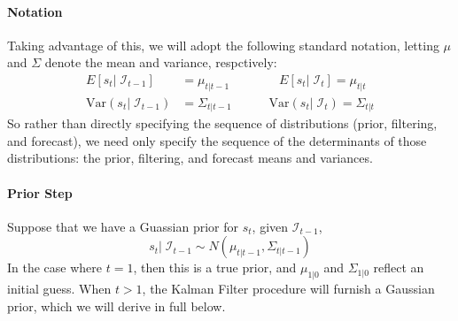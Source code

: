 \documentclass[a4paper,12pt]{article}
\begin{document}
\paragraph{Notation}
Taking advantage of this, we will adopt the following standard notation, letting $\mu$ and $\Sigma$ denote the mean and variance, respctively: 
\begin{align*}
  E[s_t|\;\mathcal{I}_{t-1}] &= \mu_{t|t-1} 
  \qquad
  \qquad
  E[s_t|\;\mathcal{I}_{t}] = \mu_{t|t}  \\
  \text{Var}(s_t|\;\mathcal{I}_{t-1}) &= \Sigma_{t|t-1}  
  \qquad
  \quad
  \text{Var}(s_t|\;\mathcal{I}_{t}) = \Sigma_{t|t} 
\end{align*}
So rather than directly specifying the sequence of distributions (prior, filtering, and forecast), we need only specify the sequence of the determinants of those distributions: the prior, filtering, and forecast means and variances.

\paragraph{Prior Step}
Suppose that we have a Guassian prior for $s_t$, given $\mathcal{I}_{t-1}$,
\[
  s_t | \; \mathcal{I}_{t-1} 
  \sim N(\mu_{t|t-1}, \Sigma_{t|t-1})
\]
In the case where $t=1$, then this is a true prior, and $\mu_{1|0}$ and $\Sigma_{1|0}$ reflect an initial guess. When $t>1$, the Kalman Filter procedure will furnish a Gaussian prior, which we will derive in full below.
\end{document}
